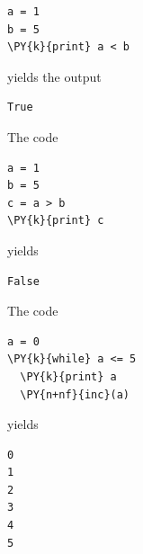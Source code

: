 \begin{bbox}
\begin{Verbatim}[commandchars=\\\{\}]
a = 1
b = 5
\PY{k}{print} a < b
\end{Verbatim}
\end{bbox}
\vspace{6mm}

\noindent
yields the output\\

\begin{ybox}
\begin{Verbatim}[commandchars=\\\{\}]
True
\end{Verbatim}
\end{ybox}
\vspace{6mm}

\noindent
The code\\

\begin{bbox}
\begin{Verbatim}[commandchars=\\\{\}]
a = 1
b = 5
c = a > b
\PY{k}{print} c
\end{Verbatim}
\end{bbox}
\vspace{6mm}

\noindent
yields\\

\begin{ybox}
\begin{Verbatim}[commandchars=\\\{\}]
False
\end{Verbatim}
\end{ybox}
\vspace{6mm}

\noindent
The code \\

\begin{bbox}
\begin{Verbatim}[commandchars=\\\{\}]
a = 0
\PY{k}{while} a <= 5
  \PY{k}{print} a 
  \PY{n+nf}{inc}(a)
\end{Verbatim}
\end{bbox}
\vspace{6mm}

\noindent
yields\\

\begin{ybox}
\begin{Verbatim}[commandchars=\\\{\}]
0
1
2
3
4
5
\end{Verbatim}
\end{ybox}
\vspace{6mm}


